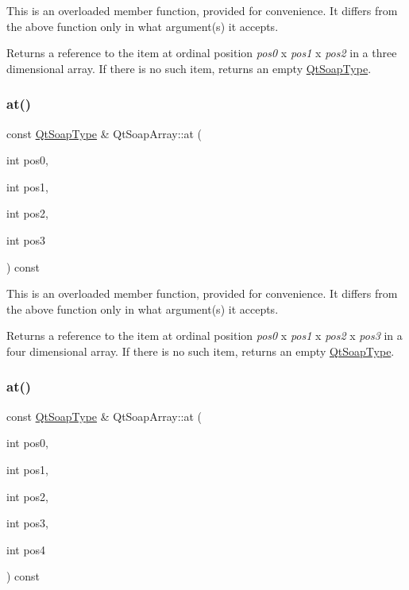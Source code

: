 This is an overloaded member function, provided for convenience. It differs from the above function only in what argument(s) it accepts.

Returns a reference to the item at ordinal position {\itshape pos0} x {\itshape pos1} x {\itshape pos2} in a three dimensional array. If there is no such item, returns an empty \mbox{\hyperlink{class_qt_soap_type}{Qt\+Soap\+Type}}. \mbox{\label{class_qt_soap_array_a8f93f6de05f6ea85419d80dee7405ea8}} 
\subsubsection{\texorpdfstring{at()}{at()}\hspace{0.1cm}{\footnotesize\ttfamily [9/10]}}
{\footnotesize\ttfamily const \mbox{\hyperlink{class_qt_soap_type}{Qt\+Soap\+Type}} \& Qt\+Soap\+Array\+::at (\begin{DoxyParamCaption}\item[{int}]{pos0,  }\item[{int}]{pos1,  }\item[{int}]{pos2,  }\item[{int}]{pos3 }\end{DoxyParamCaption}) const}

This is an overloaded member function, provided for convenience. It differs from the above function only in what argument(s) it accepts.

Returns a reference to the item at ordinal position {\itshape pos0} x {\itshape pos1} x {\itshape pos2} x {\itshape pos3} in a four dimensional array. If there is no such item, returns an empty \mbox{\hyperlink{class_qt_soap_type}{Qt\+Soap\+Type}}. \mbox{\label{class_qt_soap_array_ab83a0dcf4e7029ea01a6301e6943af92}} 
\subsubsection{\texorpdfstring{at()}{at()}\hspace{0.1cm}{\footnotesize\ttfamily [10/10]}}
{\footnotesize\ttfamily const \mbox{\hyperlink{class_qt_soap_type}{Qt\+Soap\+Type}} \& Qt\+Soap\+Array\+::at (\begin{DoxyParamCaption}\item[{int}]{pos0,  }\item[{int}]{pos1,  }\item[{int}]{pos2,  }\item[{int}]{pos3,  }\item[{int}]{pos4 }\end{DoxyParamCaption}) const}

